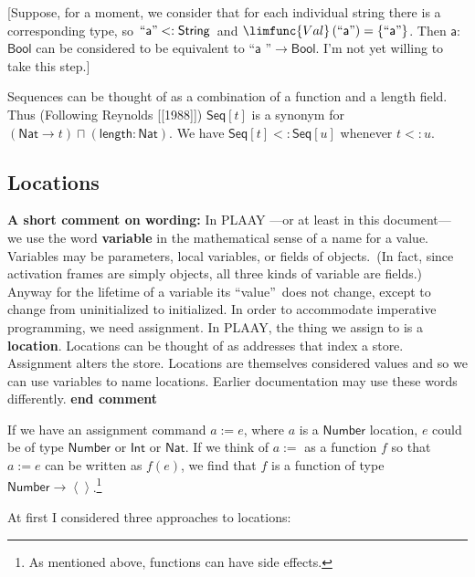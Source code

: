 \documentclass[12pt]{article}
\begin{document}
[Suppose, for a moment, we consider that for each individual string there is
a corresponding type, so $\left. \text{\textquotedblleft }\mathsf{a}\text{%
\textquotedblright }<:\mathsf{String}\right. $ and $\limfunc{Val}\left( 
\text{\textquotedblleft }\mathsf{a}\text{\textquotedblright }\right)
=\left\{ \text{\textquotedblleft }\mathsf{a}\text{\textquotedblright }%
\right\} $. Then $\mathsf{a}$\textsf{$\colon $}$\mathsf{Bool}$ can be
considered to be equivalent to \textquotedblleft $\mathsf{a}$%
\textquotedblright $\rightarrow \mathsf{Bool}$. I'm not yet willing to take
this step.]

Sequences can be thought of as a combination of a function and a length
field. Thus (Following Reynolds [[1988]]) $\mathsf{Seq}[t]$ is a synonym for 
$\left( \mathsf{Nat}\rightarrow t\right) \sqcap \left( \mathsf{length:Nat}%
\right) $. We have $\mathsf{Seq}[t]<:\mathsf{Seq}[u]$ whenever $t<:u$.

\subsection{Locations}

\textbf{A short comment on wording:} In PLAAY ---or at least in this
document--- we use the word \textbf{variable} in the mathematical sense of a
name for a value. Variables may be parameters, local variables, or fields of
objects.\ (In fact, since activation frames are simply objects, all three
kinds of variable are fields.) Anyway for the lifetime of a variable its
\textquotedblleft value\textquotedblright\ does not change, except to change
from uninitialized to initialized. In order to accommodate imperative
programming, we need assignment. In PLAAY, the thing we assign to is a 
\textbf{location}. Locations can be thought of as addresses that index a
store. Assignment alters the store. Locations are themselves considered
values and so we can use variables to name locations. Earlier documentation
may use these words differently. \textbf{end comment}

If we have an assignment command $a:=e$, where $a$ is a $\mathsf{Number}$
location, $e$ could be of type $\mathsf{Number}$ or $\mathsf{Int}$ or $%
\mathsf{Nat}$. If we think of $a:=$ as a function $f$ so that $a:=e$ can be
written as $f(e)$, we find that $f$ is a function of type $\mathsf{Number}%
\rightarrow \left\langle {}\right\rangle $.\footnote{%
As mentioned above, functions can have side effects.}

At first I considered three approaches to locations:
\end{document}
